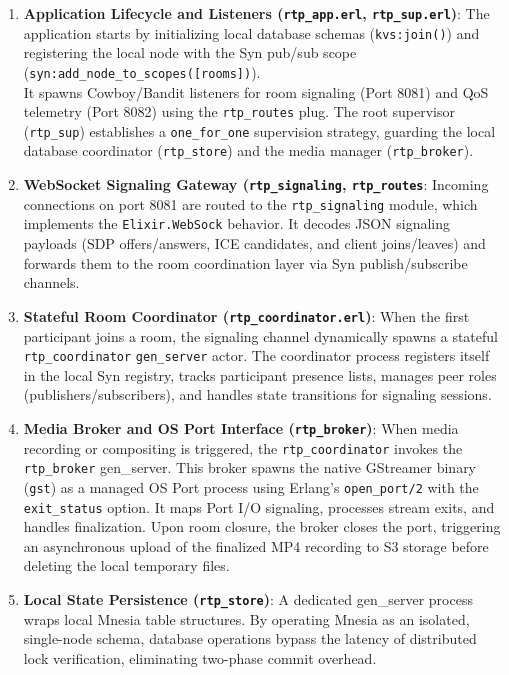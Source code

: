 \documentclass{article}
\begin{document}
\begin{enumerate}
    \item \textbf{Application Lifecycle and Listeners (\texttt{rtp\_app.erl}, \texttt{rtp\_sup.erl})}:
          The application starts by initializing local database schemas (\texttt{kvs:join()}) and registering
          the local node with the Syn pub/sub scope \\ (\texttt{syn:add\_node\_to\_scopes([rooms])}). \\
          It spawns Cowboy/Bandit listeners for room signaling (Port 8081) and QoS telemetry (Port 8082)
          using the \texttt{rtp\_routes} plug. The root supervisor (\texttt{rtp\_sup}) establishes
          a \texttt{one\_for\_one} supervision strategy, guarding the local database
          coordinator (\texttt{rtp\_store}) and the media manager (\texttt{rtp\_broker}).
    \item \textbf{WebSocket Signaling Gateway (\texttt{rtp\_signaling}, \texttt{rtp\_routes}}:
          Incoming connections on port 8081 are routed to the \texttt{rtp\_signaling} module,
          which implements the \texttt{Elixir.WebSock} behavior. It decodes JSON signaling
          payloads (SDP offers/answers, ICE candidates, and client joins/leaves) and forwards
          them to the room coordination layer via Syn publish/subscribe channels.
    \item \textbf{Stateful Room Coordinator (\texttt{rtp\_coordinator.erl})}:
          When the first participant joins a room, the signaling channel dynamically spawns
          a stateful \texttt{rtp\_coordinator} \texttt{gen\_server} actor. The coordinator
          process registers itself in the local Syn registry, tracks participant presence
          lists, manages peer roles (publishers/subscribers), and handles state transitions for signaling sessions.
    \item \textbf{Media Broker and OS Port Interface (\texttt{rtp\_broker})}:
          When media recording or compositing is triggered, the \texttt{rtp\_coordinator} invokes
          the \texttt{rtp\_broker} gen\_server. This broker spawns the native GStreamer
          binary (\texttt{gst}) as a managed OS Port process using
          Erlang's \texttt{open\_port/2} with the \texttt{exit\_status} option.
          It maps Port I/O signaling, processes stream exits, and handles finalization.
          Upon room closure, the broker closes the port, triggering an asynchronous
          upload of the finalized MP4 recording to S3 storage before deleting the
          local temporary files.
    \item \textbf{Local State Persistence (\texttt{rtp\_store})}:
          A dedicated gen\_server process wraps local Mnesia table structures.
          By operating Mnesia as an isolated, single-node schema, database operations bypass the
          latency of distributed lock verification, eliminating two-phase commit overhead.
\end{enumerate}
\end{document}
